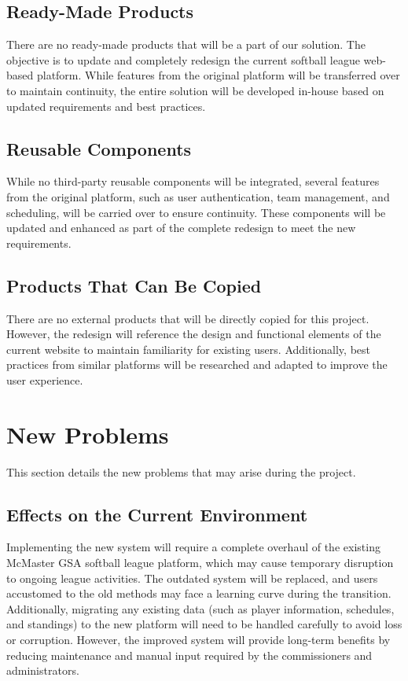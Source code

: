 \documentclass[12pt, titlepage]{article}
\begin{document}
\subsection{Ready-Made Products}
There are no ready-made products that will be a part of our solution. The objective is to update and completely redesign the current softball league web-based platform. While features from the original platform will be transferred over to maintain continuity, the entire solution will be developed in-house based on updated requirements and best practices.

\subsection{Reusable Components}
While no third-party reusable components will be integrated, several features from the original platform, such as user authentication, team management, and scheduling, will be carried over to ensure continuity. These components will be updated and enhanced as part of the complete redesign to meet the new requirements.

\subsection{Products That Can Be Copied}
There are no external products that will be directly copied for this project. However, the redesign will reference the design and functional elements of the current website to maintain familiarity for existing users. Additionally, best practices from similar platforms will be researched and adapted to improve the user experience.


\section{New Problems}
This section details the new problems that may arise during the project.
\subsection{Effects on the Current Environment}
Implementing the new system will require a complete overhaul of the existing McMaster GSA softball league platform, which may cause temporary disruption to ongoing league activities. The outdated system will be replaced, and users accustomed to the old methods may face a learning curve during the transition. Additionally, migrating any existing data (such as player information, schedules, and standings) to the new platform will need to be handled carefully to avoid loss or corruption. However, the improved system will provide long-term benefits by reducing maintenance and manual input required by the commissioners and administrators. 
\end{document}
